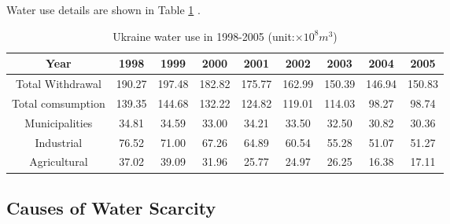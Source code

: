 Water use details are shown in Table \ref{wateruse} \cite{Liyu Han}.
\begin{table}[h]
\centering\caption{Ukraine water use in 1998-2005 (unit:$\times 10^8 m^3$)}
\begin{tabular}{c|c|c|c|c|c|c|c|c}
  \hline
  Year & 1998 & 1999 & 2000 & 2001 & 2002 & 2003 & 2004 & 2005 \\
  \hline
  Total Withdrawal & 190.27 & 197.48 & 182.82 & 175.77 & 162.99 & 150.39 & 146.94 & 150.83 \\
  \hline
  Total comsumption & 139.35 & 144.68 & 132.22 & 124.82 & 119.01 & 114.03 & 98.27 & 98.74 \\
  \hline
  Municipalities & 34.81 & 34.59 & 33.00 & 34.21 & 33.50 & 32.50 & 30.82 & 30.36 \\
  Industrial & 76.52 & 71.00 & 67.26 & 64.89 & 60.54 & 55.28 & 51.07 & 51.27 \\
  Agricultural & 37.02 & 39.09 & 31.96 & 25.77 & 24.97 & 26.25 & 16.38 & 17.11 \\
  \hline
\end{tabular}\label{wateruse}
\end{table}

\subsection{Causes of Water Scarcity}
